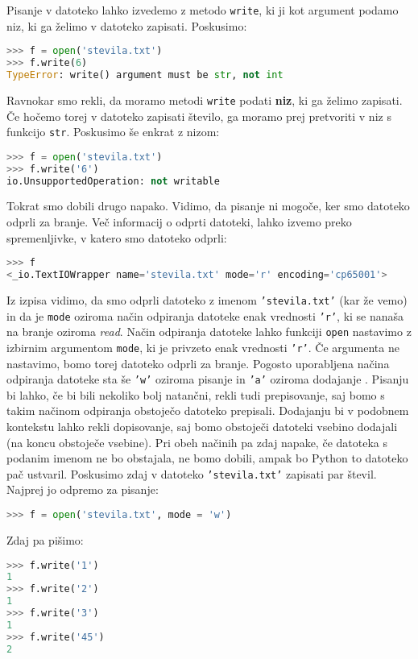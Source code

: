 Pisanje v datoteko lahko izvedemo z metodo \texttt{write}, ki ji kot argument podamo niz, ki ga želimo v datoteko zapisati. Poskusimo:
\begin{lstlisting}[language=Python, showstringspaces=false]
>>> f = open('stevila.txt')
>>> f.write(6)
TypeError: write() argument must be str, not int
\end{lstlisting}
Ravnokar smo rekli, da moramo metodi \texttt{write} podati \textbf{niz}, ki ga želimo zapisati. Če hočemo torej v datoteko zapisati število, ga moramo prej pretvoriti v niz s funkcijo \texttt{str}. Poskusimo še enkrat z nizom: 
\begin{lstlisting}[language=Python, showstringspaces=false]
>>> f = open('stevila.txt')
>>> f.write('6')
io.UnsupportedOperation: not writable
\end{lstlisting}
Tokrat smo dobili drugo napako. Vidimo, da pisanje ni mogoče, ker smo datoteko odprli za branje. Več informacij o odprti datoteki, lahko izvemo preko spremenljivke, v katero smo datoteko odprli:
\begin{lstlisting}[language=Python, showstringspaces=false]
>>> f
<_io.TextIOWrapper name='stevila.txt' mode='r' encoding='cp65001'>
\end{lstlisting}
Iz izpisa vidimo, da smo odprli datoteko z imenom \texttt{'stevila.txt'} (kar že vemo) in da je \texttt{mode} oziroma način odpiranja datoteke enak vrednosti \texttt{'r'}, ki se nanaša na branje oziroma \emph{read}. Način odpiranja datoteke lahko funkciji \texttt{open} nastavimo z izbirnim argumentom \texttt{mode}, ki je privzeto enak vrednosti \texttt{'r'}. Če argumenta ne nastavimo, bomo torej datoteko odprli za branje. Pogosto uporabljena načina odpiranja datoteke sta še \texttt{'w'} oziroma pisanje  in \texttt{'a'} oziroma dodajanje . Pisanju bi lahko, če bi bili nekoliko bolj natančni, rekli tudi prepisovanje, saj bomo s takim načinom odpiranja obstoječo datoteko prepisali. Dodajanju bi v podobnem kontekstu lahko rekli dopisovanje, saj bomo obstoječi datoteki vsebino dodajali (na koncu obstoječe vsebine). Pri obeh načinih pa zdaj napake, če datoteka s podanim imenom ne bo obstajala, ne bomo dobili, ampak bo Python to datoteko pač ustvaril. Poskusimo zdaj v datoteko \texttt{'stevila.txt'} zapisati par števil. Najprej jo odpremo za pisanje:
\begin{lstlisting}[language=Python, showstringspaces=false]
>>> f = open('stevila.txt', mode = 'w')
\end{lstlisting}
Zdaj pa pišimo:
\begin{lstlisting}[language=Python, showstringspaces=false]
>>> f.write('1')
1
>>> f.write('2')
1
>>> f.write('3')
1
>>> f.write('45')
2
\end{lstlisting}
